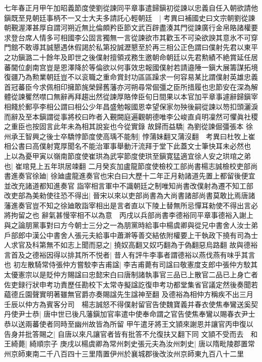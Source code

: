 七年春正月甲午加昭義節度使劉從諫同平章事遣歸鎭初從諫以忠義自任入朝欲請他鎭既至見朝廷事柄不一又士大夫多請託心輕朝廷　|{
	考異曰補國史曰文宗朝劉從諫朝覲渥澤甚厚自謂河朔近無比倫頗矜臣節文武百辟盡湊其門從諫廣行金帛賂諸權要求登台席人情多可相國李公固言獨無一言從諫欲市其歡玉不可染欲諛其意氷不可穿門館不敢導其誠懇遇休假謁於私第投誠瀝懇至於再三相公正色謂曰僕射先君以東平之功鎭潞二十餘年及即世之後僕射擅領戎務生邀朝命朝廷以先君勲績不絶賞延任居蕃閫位劇南宫豈是恩澤降於等倫欲以何事效忠報國僕射若請邉陲一鎭大展籌謀拓境復疆乃為勲業朝廷豈不以衮職之重命賞封功區區躁求一何容易某比謂僕射英雄忠義首冠蕃臣今求佩相印擁節旄榮歸舊藩亦河朔尋常倔彊之臣所措履也忠節安在深為解體從諫矍然噤口無辭再拜趨出然從諫厚賂倖臣旬日間果以本官加平章事遽辭歸鎭宰相餞於郵亭李相公謂曰相公少年昌盛勉報國恩幸望保家勿殃後嗣從諫以笏扣頭灑淚而辭及至本鎭謂從事將校曰昨者入覲闕庭遍觀朝德唯李公峻直貞明凜然可懼眞社稷之重臣也按固言此年未為相其說妄也今從實錄}
故歸而益驕|{
	為劉從諫倔彊張本}
徐州承王智興之後士卒驕悖節度使高瑀不能制|{
	悖蒲妹翻又蒲沒翻　考異曰杜牧上崔相公書曰高僕射寛厚聞名不能治軍事舉動汗流拜于堂下此蓋文士筆快耳未必然也}
上以為憂甲寅以嶺南節度使崔珙為武寜節度使珙至鎭寛猛適宜徐人安之珙琯之弟也|{
	崔琯見上五年珙居竦翻}
二月癸亥加盧龍節度使檢校工部尚書楊志誠檢校吏部尚書進奏官徐廸|{
	徐廸盧龍進奏官也宋白曰大歷十二年正月勑諸道先置上都留後便宜並改充諸道都知進奏官}
詣宰相言軍中不識朝廷之制唯知尚書改僕射為遷不知工部改吏部為美勑使往恐不得出|{
	晉宋以來以吏部尚書為大尚書諸部尚書莫敢比焉唐諸藩進奏官豈不知之徐廸敢詣宰相出是言者直以下陵上替無所忌憚耳勑使不得出言必將拘留之也}
辭氣甚慢宰相不以為意　丙戌以兵部尚書李德裕同平章事德裕入謝上與之論朋黨事對曰方今朝士三分之一為朋黨時給事中楊虞卿與從兄中書舍人汝士弟戶部郎中漢公中書舍人張元夫給事中蕭澣等善交結依附權要上干執政下撓有司為士人求官及科第無不如志上聞而惡之|{
	撓奴高翻又奴巧翻為于偽翻惡烏路翻}
故與德裕言首及之德裕因得以排其所不悦者|{
	昔人有評牛李事者謂德裕以燕伐燕有味乎其言也}
初左散騎常侍張仲方嘗駮李吉甫諡|{
	李吉甫薨有司諡曰敬憲度支郎中張仲方駮其太優憲宗以是貶仲方賜諡曰忠懿宋白曰唐制諸執事官三品已上散官二品已上身亡者佐吏録行狀申考功責歷任勘校下太常寺擬諡訖復申考功都堂集省官議定然後奏聞若藴德丘園聲實明著雖無官爵亦奏賜諡先生諡神至翻}
及德裕為相仲方稱疾不出三月壬辰以仲方為賓客分司　楊志誠怒不得僕射留官告使魏寶義并春衣使焦奉鸞送奚契丹使尹士恭|{
	唐中世已後凡藩鎭加官率遣中使奉命謂之官告使焦奉鸞以賜春衣尹士恭以送兩蕃使者同時至幽州故皆為所留}
甲午遣牙將王文頴來謝恩并讓官丙申復以告身并批答賜之|{
	自唐以來凡讓官者皆有批答不允復扶又翻下同}
文頴不受而去　和王綺薨|{
	綺順宗子}
庚戌以楊虞卿為常州刺史張元夫為汝州刺史|{
	唐以隋毗陵郡置常州京師東南二千八百四十三里隋置伊州於襄城郡後改汝州京師東九百八十二里}

